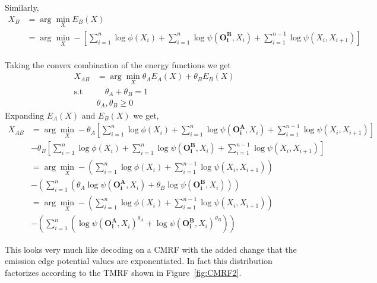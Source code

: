 \documentclass{article}
\begin{document}
Similarly,
\begin{align*}
X_B &= \arg \min_X E_B(X) \\
&= \arg \min_X -\left[{\sum_{i=1}^{n} \log\phi(X_i)+\sum_{i=1}^{n} \log\psi(\mathbf{O^B_i},X_i)+ \sum_{i=1}^{n-1}{\log\psi(X_i,X_{i+1})}}\right]
\end{align*}
\\
Taking the convex combination of the energy functions we get 
\begin{align*}
X_{AB} &= \arg \min_X \theta_A E_A(X) + \theta_B E_B(X) \\
\text{s.t} &\quad  \theta_A + \theta_B  = 1 \\
& \theta_A, \theta_B \geq 0
\end{align*}
Expanding $E_A(X)$ and $E_B(X)$ we get, 
\begin{align*}
X_{AB} &= \arg \min_X -\theta_A \left[{\sum_{i=1}^{n} \log\phi(X_i)+\sum_{i=1}^{n} \log\psi(\mathbf{O^A_i},X_i)+ \sum_{i=1}^{n-1}{\log\psi(X_i,X_{i+1})}}\right] \\
&-\theta_B \left[{\sum_{i=1}^{n} \log\phi(X_i)+\sum_{i=1}^{n} \log\psi(\mathbf{O^B_i},X_i)+ \sum_{i=1}^{n-1}{\log\psi(X_i,X_{i+1})}}\right] \\
&= \arg \min_X -\left( \sum_{i=1}^{n}{\log\phi(X_i)} + \sum_{i=1}^{n-1}{\log\psi(X_i,X_{i+1})}\right)\\ 
 &-\left( \sum_{i=1}^{n}{(\theta_A\log\psi(\mathbf{O^A_i},X_i) + \theta_B\log\psi(\mathbf{O^B_i},X_i))} \right) \\
 &= \arg \min_X -\left( \sum_{i=1}^{n}{\log\phi(X_i)} + \sum_{i=1}^{n-1}{\log\psi(X_i,X_{i+1})}\right)\\ 
 &-\left( \sum_{i=1}^{n}{(\log\psi(\mathbf{O^A_i},X_i)^{\theta_A} + \log\psi(\mathbf{O^B_i},X_i)^{\theta_B})} \right)
\end{align*}

This looks very much like decoding on a CMRF with the added change that the emission edge potential values are exponentiated. In fact this distribution factorizes according to the TMRF shown in Figure~\ref{fig:CMRF2}.
\end{document}
